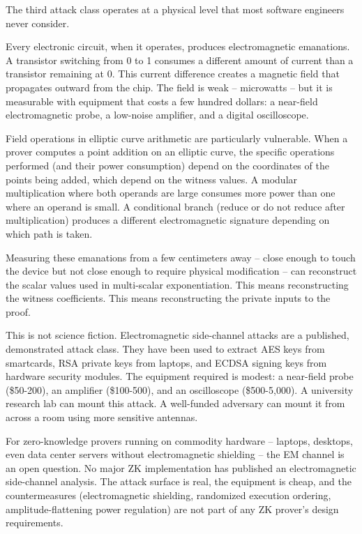 \documentclass[
  11pt,
  openany]{report}
\begin{document}
The third attack class operates at a physical level that most software engineers
never consider.

Every electronic circuit, when it operates, produces electromagnetic emanations.
A transistor switching from 0 to 1 consumes a different amount of current than a
transistor remaining at 0. This current difference creates a magnetic field that
propagates outward from the chip. The field is weak -- microwatts -- but it is
measurable with equipment that costs a few hundred dollars: a near-field
electromagnetic probe, a low-noise amplifier, and a digital oscilloscope.

Field operations in elliptic curve arithmetic are particularly vulnerable. When
a prover computes a point addition on an elliptic curve, the specific operations
performed (and their power consumption) depend on the coordinates of the points
being added, which depend on the witness values. A modular multiplication where
both operands are large consumes more power than one where an operand is small.
A conditional branch (reduce or do not reduce after multiplication) produces a
different electromagnetic signature depending on which path is taken.

Measuring these emanations from a few centimeters away -- close enough to touch
the device but not close enough to require physical modification -- can
reconstruct the scalar values used in multi-scalar exponentiation. This means
reconstructing the witness coefficients. This means reconstructing the private
inputs to the proof.

This is not science fiction. Electromagnetic side-channel attacks are a
published, demonstrated attack class. They have been used to extract AES keys
from smartcards, RSA private keys from laptops, and ECDSA signing keys from
hardware security modules. The equipment required is modest: a near-field probe
(\$50-200), an amplifier (\$100-500), and an oscilloscope (\$500-5,000). A
university research lab can mount this attack. A well-funded adversary can mount
it from across a room using more sensitive antennas.

For zero-knowledge provers running on commodity hardware -- laptops, desktops,
even data center servers without electromagnetic shielding -- the EM channel is
an open question. No major ZK implementation has published an electromagnetic
side-channel analysis. The attack surface is real, the equipment is cheap, and
the countermeasures (electromagnetic shielding, randomized execution ordering,
amplitude-flattening power regulation) are not part of any ZK prover's design
requirements.
\end{document}
